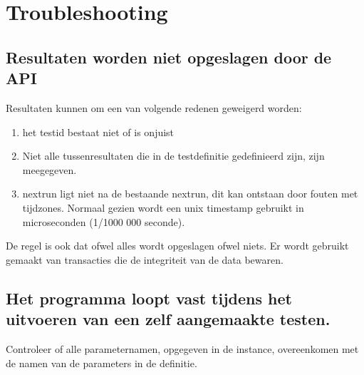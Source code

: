 \section{Troubleshooting}
\subsection{Resultaten worden niet opgeslagen door de API}
\npar
Resultaten kunnen om een van volgende redenen geweigerd worden:
\begin{enumerate}
\item het testid bestaat niet of is onjuist
\item Niet alle tussenresultaten die in de testdefinitie gedefinieerd zijn, zijn meegegeven. 
\item nextrun ligt niet na de bestaande nextrun, dit kan ontstaan door fouten met tijdzones. Normaal gezien wordt een unix timestamp gebruikt in microseconden (1/1000 000 seconde).
\end{enumerate}
De regel is ook dat ofwel alles wordt opgeslagen ofwel niets. Er wordt gebruikt gemaakt van transacties die de integriteit van de data bewaren.
\subsection{Het programma loopt vast tijdens het uitvoeren van een zelf aangemaakte testen.}
\npar 
Controleer of alle parameternamen, opgegeven in de instance, overeenkomen met de namen van de parameters in de definitie.